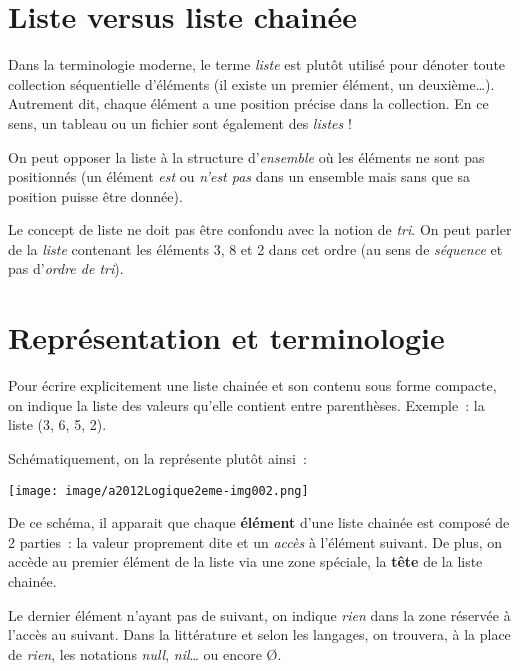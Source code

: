 \section{Liste versus liste chainée}

	Dans la terminologie moderne, le terme \textit{liste} est 
	plutôt utilisé pour dénoter toute collection séquentielle
	d'éléments (il existe un premier élément, un deuxième{\dots}). 
	Autrement dit, chaque élément a une position précise dans
	la collection. En ce sens, un tableau ou un fichier sont 
	également des \textit{listes} !
	
	On peut opposer la liste à la structure d'\textit{ensemble} 
	où les éléments ne sont pas positionnés (un élément
	\textit{est} ou \textit{n'est pas} dans un ensemble mais 
	sans que sa position puisse être donnée).
	
	Le concept de liste ne doit pas être confondu avec la notion 
	de \textit{tri}. On peut parler de la \textit{liste}
	contenant les éléments 3, 8 et 2 dans cet ordre 
	(au sens de \textit{séquence} et pas d'\textit{ordre de tri}).


\section{Représentation et terminologie}

	Pour écrire explicitement une liste chainée et son contenu 
	sous forme compacte, on indique la liste des valeurs qu'elle
	contient entre parenthèses. Exemple~: la liste (3, 6, 5, 2).
	
	Schématiquement, on la représente plutôt ainsi~:

	\begin{center}
	\texttt{[image: image/a2012Logique2eme-img002.png]}
	\end{center}
	
	De ce schéma, il apparait que chaque \textbf{élément} 
	d'une liste chainée est composé de 2 parties~: la valeur
	proprement dite et un \textit{accès} à l'élément suivant. 
	De plus, on accède au premier élément de la liste via une
	zone spéciale, la \textbf{tête} de la liste chainée.

	Le dernier élément n'ayant pas de suivant, on indique \textit{rien} 
	dans la zone réservée à l'accès au suivant. Dans la
	littérature et selon les langages, on trouvera, à la place de \textit{rien}, 
	les notations \textit{null}, \textit{nil}{\dots} ou encore Ø.
	
